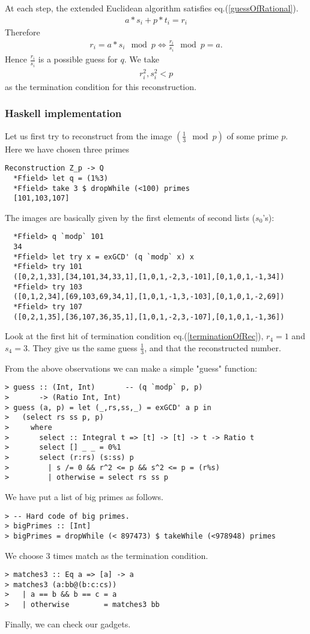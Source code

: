 \documentclass[11pt]{book}
\begin{document}
At each step, the extended Euclidean algorithm satisfies eq.(\ref{guessOfRational}).
\begin{eqnarray}
a*s_i + p*t_i = r_i
\end{eqnarray}
Therefore
\begin{eqnarray}
r_i = a*s_i \mod p \Leftrightarrow \frac{r_i}{s_i} \mod p = a.
\end{eqnarray}
Hence $\frac{r_i}{s_i}$ is a possible guess for $q$.
We take
\begin{eqnarray}
\label{terminationOfRec}
r_i^2 , s_i^2 < p
\end{eqnarray}
as the termination condition for this reconstruction.

\subsubsection{Haskell implementation}
Let us first try to reconstruct from the image $(\frac{1}{3} \mod p)$ of some prime $p$.
Here we have chosen three primes
\begin{verbatim}
Reconstruction Z_p -> Q
  *Ffield> let q = (1%3)
  *Ffield> take 3 $ dropWhile (<100) primes
  [101,103,107]
\end{verbatim}
The images are basically given by the first elements of second lists ($s_0$'s):
\begin{verbatim}  
  *Ffield> q `modp` 101
  34
  *Ffield> let try x = exGCD' (q `modp` x) x
  *Ffield> try 101
  ([0,2,1,33],[34,101,34,33,1],[1,0,1,-2,3,-101],[0,1,0,1,-1,34])
  *Ffield> try 103
  ([0,1,2,34],[69,103,69,34,1],[1,0,1,-1,3,-103],[0,1,0,1,-2,69])
  *Ffield> try 107
  ([0,2,1,35],[36,107,36,35,1],[1,0,1,-2,3,-107],[0,1,0,1,-1,36])  
\end{verbatim}
Look at the first hit of termination condition eq.(\ref{terminationOfRec}), $r_4=1$ and $s_4=3$.
They give us the same guess $\frac{1}{3}$, and that the reconstructed number.

From the above observations we can make a simple "guess" function:
\begin{verbatim}
> guess :: (Int, Int)       -- (q `modp` p, p)
>       -> (Ratio Int, Int)
> guess (a, p) = let (_,rs,ss,_) = exGCD' a p in
>   (select rs ss p, p)
>     where
>       select :: Integral t => [t] -> [t] -> t -> Ratio t
>       select [] _ _ = 0%1
>       select (r:rs) (s:ss) p
>         | s /= 0 && r^2 <= p && s^2 <= p = (r%s)
>         | otherwise = select rs ss p
\end{verbatim}
We have put a list of big primes as follows.
\begin{verbatim}
> -- Hard code of big primes.
> bigPrimes :: [Int]
> bigPrimes = dropWhile (< 897473) $ takeWhile (<978948) primes  
\end{verbatim}
We choose 3 times match as the termination condition.
\begin{verbatim}
> matches3 :: Eq a => [a] -> a
> matches3 (a:bb@(b:c:cs))
>   | a == b && b == c = a
>   | otherwise        = matches3 bb
\end{verbatim}
Finally, we can check our gadgets.
\end{document}
